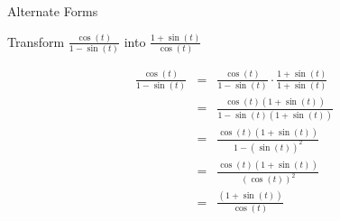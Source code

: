 \documentclass{ximera}
\begin{document}
\begin{example} Alternate Forms


Transform $\frac{\cos(t)}{1 - \sin(t)}$ into $\frac{1 + \sin(t)}{\cos(t)}$



\begin{explanation}

\begin{align*}
\frac{\cos(t)}{1 - \sin(t)}  &  = &  \frac{\cos(t)}{1 - \sin(t)}  \cdot \frac{1 + \sin(t)}{1 + \sin(t)}  \\
                           &  = &  \frac{\cos(t)(1 + \sin(t))}{1 - \sin(t)(1 + \sin(t))}  \\
                           &  = &  \frac{\cos(t)(1 + \sin(t))}{1 - (\sin(t))^2}  \\
                           &  = &  \frac{\cos(t)(1 + \sin(t))}{(\cos(t))^2}  \\
                           &  = &  \frac{(1 + \sin(t))}{\cos(t)}  
\end{align*}



\end{explanation}




\end{example}
\end{document}
